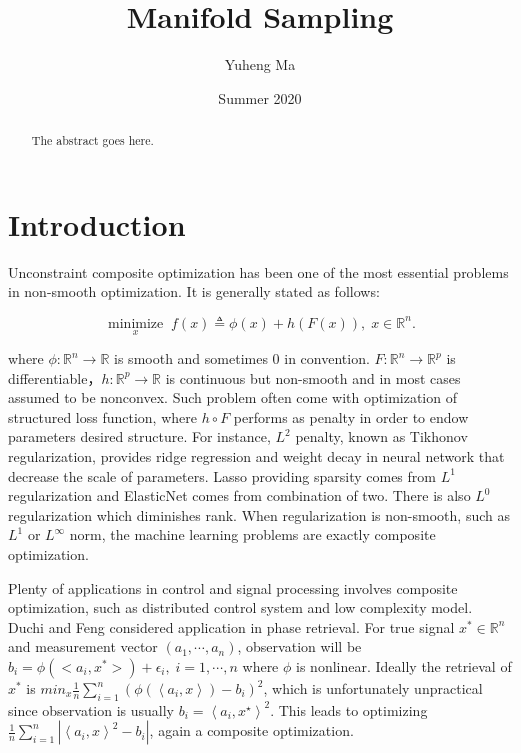 \documentclass[10pt, oneside]{article}
\title{
 Manifold Sampling
}
\author{Yuheng Ma}
\date{Summer 2020}
\begin{document}
\maketitle
\vspace{.25in}
\begin{abstract}
The abstract goes here.
\end{abstract}
\vspace{.25in}

\section{Introduction}
Unconstraint composite optimization has been one of the most essential problems in non-smooth optimization. It is generally stated as follows:

\begin{equation}
\underset{x}{\operatorname{minimize}} \; f(x) \triangleq \phi(x)+h(F(x)),  \; x \in \mathbb{R}^n. 
\label{problem}
\end{equation}

where $\phi: \mathbb{R}^n\rightarrow \mathbb{R}$ is smooth and sometimes 0 in convention. $F: \mathbb{R}^{n} \rightarrow \mathbb{R}^{p}$ is differentiable，$h: \mathbb{R}^{p} \rightarrow \mathbb{R}$ is continuous but non-smooth and in most cases assumed to be nonconvex. Such problem often come with optimization of structured loss function, where $h\circ F$ performs as penalty in order to endow parameters desired structure. For instance, $L^2$ penalty, known as Tikhonov regularization,  provides ridge regression and weight decay in neural network that decrease the scale of parameters. Lasso \cite{Lasso} providing sparsity comes from $L^1$ regularization and ElasticNet \cite{ElasticNet} comes from combination of two. There is also $L^0$ regularization which diminishes rank. When regularization is non-smooth, such as $L^1$ or $L^{\infty}$ norm\cite{NonlinearEqLInfty}, the machine learning problems are exactly composite optimization. 
\par
Plenty of applications in control and signal processing involves composite optimization\cite{CharalambousC}, such as distributed control system\cite{distributedcontrol} and low complexity model\cite{lowcomplexity}. Duchi and Feng \cite{phaseretrieval} considered application in phase retrieval. For true signal $x^*\in \mathbb{R}^n$ and measurement vector $(a_1,\cdots,a_n)$, observation will be $b_i=\phi(<a_i,x^*>)+\epsilon_i,\;i=1,\cdots,n$ where $\phi$ is nonlinear. Ideally the retrieval of $x^*$ is $min_x \frac{1}{n} \sum_{i=1}^{n}\left(\phi\left(\left\langle a_{i}, x\right\rangle\right)-b_{i}\right)^{2}$, which is unfortunately unpractical since observation is usually $b_{i}=\left\langle a_{i}, x^{\star}\right\rangle^{2}$. This leads to optimizing $\frac{1}{n} \sum_{i=1}^{n}\left|\left\langle a_{i}, x\right\rangle^{2}-b_{i}\right|$, again a composite optimization. 
\par
\end{document}
